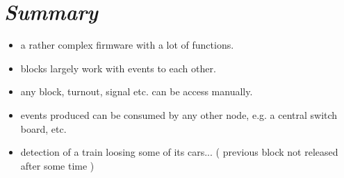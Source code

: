 \section{\textit{Summary}}
\begin{itemize}
\begin{itemize}
\item a rather complex firmware with a lot of functions.
\item blocks largely work with events to each other.
\item any block, turnout, signal etc. can be access manually.
\item events produced can be consumed by any other node, e.g. a central switch board, etc.
\item detection of a train loosing some of its cars... ( previous block not released after some time )
\end{itemize}
\end{itemize}
